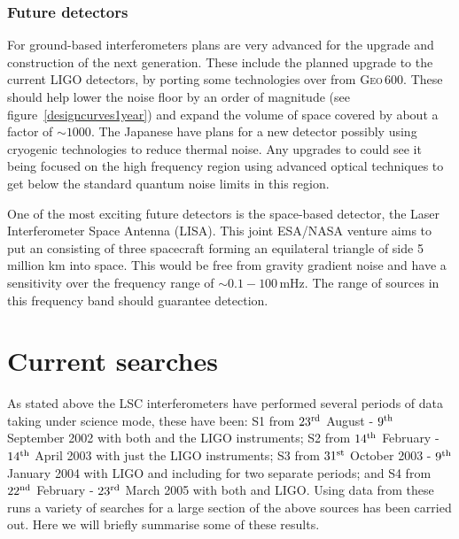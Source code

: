 \subsubsection{Future detectors}
For ground-based interferometers plans are very advanced for the upgrade and construction of the
next generation. These include the planned upgrade to the current LIGO detectors, by porting some
technologies over from \textsc{Geo}\,600. These should help lower the noise floor by an order of
magnitude (see figure~\ref{designcurves1year}) and expand the volume of space covered by about a
factor of $\sim 1000$. The Japanese have plans for a new detector possibly using cryogenic
technologies to reduce thermal noise. Any upgrades to \geo could see it being focused on the high
frequency region using advanced optical techniques to get below the standard quantum noise limits in
this region.

One of the most exciting future detectors is the space-based detector, the Laser Interferometer 
Space Antenna (LISA). This joint ESA/NASA venture aims to put an \ifo consisting of three
spacecraft forming an equilateral triangle of side 5 million km into space. This would be free
from gravity gradient noise and have a sensitivity over the frequency range of $\sim 0.1-100$\,mHz.
The range of sources in this frequency band should guarantee \gw detection.  


\section{Current searches}
As stated above the LSC interferometers have performed several periods of data taking under science
mode, these have been: S1 from $23^{\rm rd}$ August - $9^{\rm th}$ September 2002 with both \geo
and the LIGO instruments; S2 from $14^{\rm th}$ February - $14^{\rm th}$ April 2003 with just the
LIGO instruments; S3 from $31^{\rm st}$ October 2003 - $9^{\rm th}$ January 2004 with LIGO and
including \geo for two separate periods; and S4 from $22^{\rm nd}$ February - $23^{\rm rd}$ March
2005 with both \geo and LIGO.  Using data from these runs a variety of searches for a large section
of the above sources has been carried out. Here we will briefly summarise some of these results.

